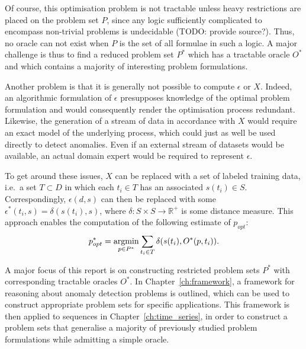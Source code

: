 Of course, this optimisation problem is not tractable unless heavy restrictions are placed on the problem set $P$, since any logic sufficiently complicated to encompass non-trivial problems is undecidable (TODO: provide source?). Thus, no oracle can not exist when $P$ is the set of all formulae in such a logic. A major challenge is thus to find a reduced problem set $P^*$ which has a tractable oracle $O^*$ and which contains a majority of interesting problem formulations.

Another problem is that it is generally not possible to compute $\epsilon$ or $X$. Indeed, an algorithmic formulation of $\epsilon$ presupposes knowledge of the optimal problem formulation and would consequently render the optimisation process redundant. Likewise, the generation of a stream of data in accordance with $X$ would require an exact model of the underlying process, which could just as well be used directly to detect anomalies. Even if an external stream of datasets would be available, an actual domain expert would be required to represent $\epsilon$.

To get around these issues, $X$ can be replaced with a set of labeled training data, i.e.\ a set $T \subset D$ in which each $t_i \in T$ has an associated $s(t_i) \in S$.
Correspondingly, $\epsilon(d, s)$ can then be replaced with some $\epsilon^*(t_i, s) = \delta(s(t_i), s)$, where $\delta: S \times S \rightarrow \mathbb{R}^+$ is some distance measure.
This approach enables the computation of the following estimate of $p_{opt}$:
\[
    p^*_{opt} = \argmin_{p \in P^*} \sum_{t_i \in T} \delta(s(t_i), O^*(p, t_i)).
\]

A major focus of this report is on constructing restricted problem sets $P^*$ with corresponding tractable oracles $O^*$. In Chapter~\ref{ch:framework}, a framework for reasoning about anomaly detection problems is outlined, which can be used to construct appropriate problem sets for specific applications. This framework is then applied to sequences in Chapter~\ref{ch:time_series}, in order to construct a problem sets that generalise a majority of previously studied problem formulations while admitting a simple oracle.
